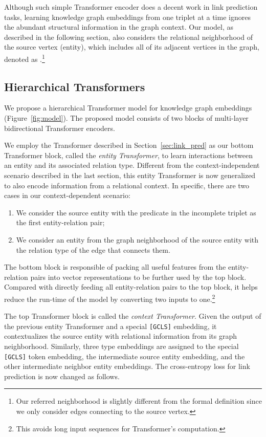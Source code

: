 \documentclass[11pt]{article}
\begin{document}
Although such simple Transformer encoder does a decent work in link prediction tasks, learning knowledge graph embeddings from one triplet at a time ignores the abundant structural information in the graph context. Our model, as described in the following section, also considers the relational neighborhood of the source vertex (entity), which includes all of its adjacent vertices in the graph, denoted as .\footnote{Our referred neighborhood is slightly different from the formal definition since we only consider edges connecting to the source vertex.}

\subsection{Hierarchical Transformers} \label{sec:htrme}

We propose a hierarchical Transformer model for knowledge graph embeddings (Figure~\ref{fig:model}). The proposed model consists of two blocks of multi-layer bidirectional Transformer encoders. 

We employ the Transformer described in Section~\ref{sec:link_pred} as our bottom Transformer block, called the \emph{entity Transformer}, to learn interactions between an entity and its associated relation type.
Different from the context-independent scenario described in the last section, this entity Transformer is now generalized to also encode information from a relational context.
In specific, there are two cases in our context-dependent scenario:
\begin{enumerate} 
\item We consider the source entity with the predicate in the incomplete triplet as the first entity-relation pair; 
\item We consider an entity from the graph neighborhood of the source entity with the relation type of the edge that connects them.
\end{enumerate}
The bottom block is responsible of packing all useful features from the entity-relation pairs into vector representations to be further used by the top block. Compared with directly feeding all entity-relation pairs to the top block, it helps reduce the run-time of the model by converting two inputs to one.\footnote{This avoids long input sequences for Transformer's  computation.}

The top Transformer block is called the \emph{context Transformer}.
Given the output of the previous entity Transformer and a special \texttt{[GCLS]} embedding, it contextualizes the source entity with relational information from its graph neighborhood.
Similarly, three type embeddings are assigned to the special \texttt{[GCLS]} token embedding, the intermediate source entity embedding, and the other intermediate neighbor entity embeddings.
The cross-entropy loss for link prediction is now changed as follows.
\end{document}

